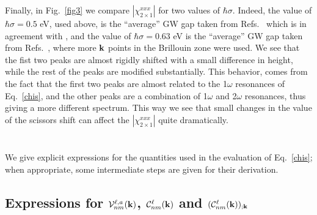 \documentclass[floatfix,prb,aps,superscriptaddress,11pt,preprint,letterpaper]{revtex4}
\begin{document}
Finally, in Fig.~\ref{fig3} we compare 
$|\chi^{xxx}_{2\times 1}|$ for two values of $\hbar\sigma$. Indeed,
the value of $\hbar\sigma=0.5$ eV, used above, is the ``average'' GW gap taken from 
Refs.~ which is in agreement with , and  
the value of $\hbar\sigma=0.63$ eV is the ``average'' GW gap taken from 
Refs.~, where more $\mathbf{k}$ points in the
Brillouin zone were used.
We see that the fist two peaks are almost rigidly shifted with a small
difference in height, while the rest of the peaks are modified
substantially. This behavior, comes from the fact that the first two
peaks are almost related to the 1$\omega$ resonances of
Eq.~\eqref{chis}, and the other peaks are a combination of 1$\omega$
and 2$\omega$ resonances, thus giving a more different spectrum. This
way we see that small changes in the value of the scissors shift can affect the
$|\chi^{xxx}_{2\times 1}|$ quite dramatically.


\appendix 
\section{}\label{appe}
We give explicit expressions for the quantities used in the evaluation 
of Eq.~\eqref{chis}; when appropriate, some 
intermediate steps are given for their derivation. 
\subsection{ Expressions for 
\texorpdfstring{${\cal V}^{\ell,a}_{nm}(\mathbf{k})$, 
${\cal C}^{\ell}_{nm}(\mathbf{k})$ 
and
$({\cal C}^{\ell}_{nm}(\mathbf{k}))_{;\mathbf{k}}$
}{Vnm and Cnm}}\label{calpcalc}
\end{document}

